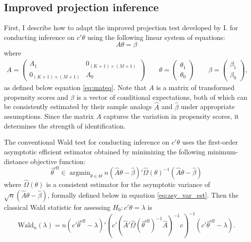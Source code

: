 \documentclass[11pt]{article}
\theoremstyle{definition}
\DeclareMathOperator*{\argmin}{argmin}
\newcommand{\0}{\ensuremath{\mathbf{0}}}
\begin{document}
\begin{bibunit}
\subsection{Improved projection inference}
First, I describe how to adapt the improved projection test developed by I. \cite{andrews.i:2018} for conducting inference on $c'\theta$ using the following linear system of equations:
\begin{equation}
\label{eq:linsystem}
	A\theta = \beta	
\end{equation}
where 
	\begin{align*}
	A = 
	\begin{pmatrix}
	A_1 & 0_{(K+1)\times (M+1)} \\
	0_{(K+1)\times (M+1)}		& A_0
	\end{pmatrix}
	\qquad
	\theta =
	\begin{pmatrix}
	\theta_1 \\
	\theta_0
	\end{pmatrix}
	\qquad 
	\beta = 
	\begin{pmatrix}
	\beta_1 \\
	\beta_0
	\end{pmatrix},
	\end{align*}
as defined below equation \eqref{eq:mateq}. Note that $A$ is a matrix of transformed propensity scores and $\beta$ is a vector of conditional expectations, both of which can be consistently estimated by their sample analogs $\hat{A}$ and $\hat{\beta}$ under appropriate assumptions. Since the matrix $A$ captures the variation in propensity scores, it determines the strength of identification.

The conventional Wald test for conducting inference on $c'\theta$ uses the first-order asymptotic efficient estimator obtained by minimizing the following minimum-distance objective function:
\[
        \hat{\theta}^{\text{eff}} \in \argmin_{\theta\in \Theta} n(\hat{A}\theta - \hat{\beta})'{\hat{\Omega}(\theta)^{-1}}(\hat{A}\theta - \hat{\beta})
\]
where $\hat{\Omega}(\theta)$ is a consistent estimator for the asymptotic variance of $\sqrt{n}(\hat{A}\theta - \hat{\beta})$, formally defined below in equation \eqref{eq:asy_var_est}. %
Then the classical Wald statistic for assessing $H_0: c'\theta = \lambda$ is 
\begin{equation}
\label{eq:wald_stat}
	\text{Wald}_n(\lambda) = n(c'\hat{\theta}^{\text{eff}} - \lambda)' (c'(\hat{A}'\hat{\Omega}(\hat{\theta}^{\text{eff}})^{-1}\hat{A})^{-1}c)^{-1}(c'\hat{\theta}^{\text{eff}} - \lambda).
\end{equation}


\end{bibunit}
\end{document}
